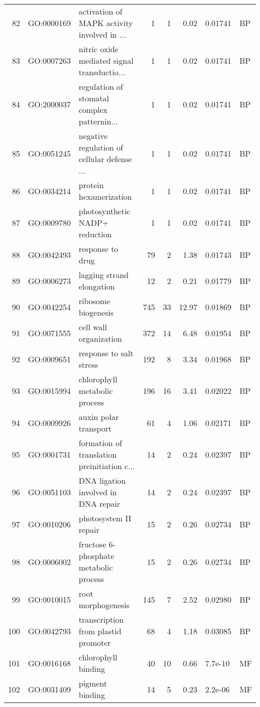 \documentclass[12pt,oneside,a4paper]{article}
\begin{document}
\begin{longtable}{rllrrrll}
  82 & GO:0000169 & activation of MAPK activity involved in ... &   1 &   1 & 0.02 & 0.01741 & BP \\ 
  83 & GO:0007263 & nitric oxide mediated signal transductio... &   1 &   1 & 0.02 & 0.01741 & BP \\ 
  84 & GO:2000037 & regulation of stomatal complex patternin... &   1 &   1 & 0.02 & 0.01741 & BP \\ 
  85 & GO:0051245 & negative regulation of cellular defense ... &   1 &   1 & 0.02 & 0.01741 & BP \\ 
  86 & GO:0034214 & protein hexamerization &   1 &   1 & 0.02 & 0.01741 & BP \\ 
  87 & GO:0009780 & photosynthetic NADP+ reduction &   1 &   1 & 0.02 & 0.01741 & BP \\ 
  88 & GO:0042493 & response to drug &  79 &   2 & 1.38 & 0.01743 & BP \\ 
  89 & GO:0006273 & lagging strand elongation &  12 &   2 & 0.21 & 0.01779 & BP \\ 
  90 & GO:0042254 & ribosome biogenesis & 745 &  33 & 12.97 & 0.01869 & BP \\ 
  91 & GO:0071555 & cell wall organization & 372 &  14 & 6.48 & 0.01954 & BP \\ 
  92 & GO:0009651 & response to salt stress & 192 &   8 & 3.34 & 0.01968 & BP \\ 
  93 & GO:0015994 & chlorophyll metabolic process & 196 &  16 & 3.41 & 0.02022 & BP \\ 
  94 & GO:0009926 & auxin polar transport &  61 &   4 & 1.06 & 0.02171 & BP \\ 
  95 & GO:0001731 & formation of translation preinitiation c... &  14 &   2 & 0.24 & 0.02397 & BP \\ 
  96 & GO:0051103 & DNA ligation involved in DNA repair &  14 &   2 & 0.24 & 0.02397 & BP \\ 
  97 & GO:0010206 & photosystem II repair &  15 &   2 & 0.26 & 0.02734 & BP \\ 
  98 & GO:0006002 & fructose 6-phosphate metabolic process &  15 &   2 & 0.26 & 0.02734 & BP \\ 
  99 & GO:0010015 & root morphogenesis & 145 &   7 & 2.52 & 0.02980 & BP \\ 
  100 & GO:0042793 & transcription from plastid promoter &  68 &   4 & 1.18 & 0.03085 & BP \\ 
  101 & GO:0016168 & chlorophyll binding &  40 &  10 & 0.66 & 7.7e-10 & MF \\ 
  102 & GO:0031409 & pigment binding &  14 &   5 & 0.23 & 2.2e-06 & MF \\ 

\end{longtable}
\end{document}
